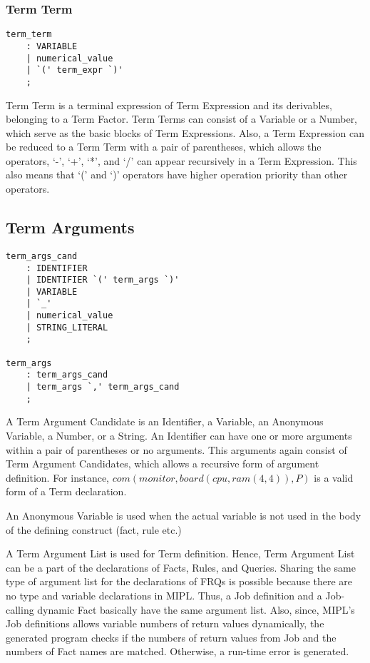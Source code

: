 \documentclass[prodmode,acmtecs]{acmsmall}
\begin{document}
\subsubsection{Term Term}
\begin{lstlisting}
term_term
	: VARIABLE
	| numerical_value
	| `(' term_expr `)'
	;
\end{lstlisting}

Term Term is a terminal expression of Term Expression and its derivables,
belonging to a Term Factor.  Term Terms can consist of a Variable or a
Number, which serve as the basic blocks of Term Expressions.  Also, a Term
Expression can be reduced to a Term Term with a pair of parentheses, which
allows the operators, `-', `+', `*', and `/' can appear recursively in a
Term Expression.  This also means that `(' and `)' operators have higher
operation priority than other operators.
\medskip

\subsection{Term Arguments}

\begin{lstlisting}
term_args_cand
	: IDENTIFIER
	| IDENTIFIER `(' term_args `)'
	| VARIABLE
	| `_'
	| numerical_value
	| STRING_LITERAL
	;

term_args
	: term_args_cand
	| term_args `,' term_args_cand
	;

\end{lstlisting}

A Term Argument Candidate is an Identifier, a Variable, an Anonymous
Variable, a Number, or a String.  An Identifier can have one
or more arguments within a pair of parentheses or no arguments.
This arguments again consist of Term Argument Candidates, which
allows a recursive form of argument definition.  For instance, 
$com(monitor, board(cpu, ram(4, 4)), P)$ is a valid form
of a Term declaration.

An Anonymous Variable is used when the actual variable is not used in the 
body of the defining construct (fact, rule etc.)

A Term Argument List is used for Term definition. Hence, Term
Argument List can be a part of the declarations of Facts, Rules,
and Queries.  Sharing the same type of argument list for the
declarations of FRQs is possible because there are no type and
variable declarations in MIPL.  Thus, a Job definition and
a Job-calling dynamic Fact basically have the same argument list.
Also, since, MIPL's Job definitions allows variable numbers of return
values dynamically, the generated program
checks if the numbers of return values from Job and the numbers of
Fact names are matched.  Otherwise, a run-time error is generated.
\medskip
\end{document}
